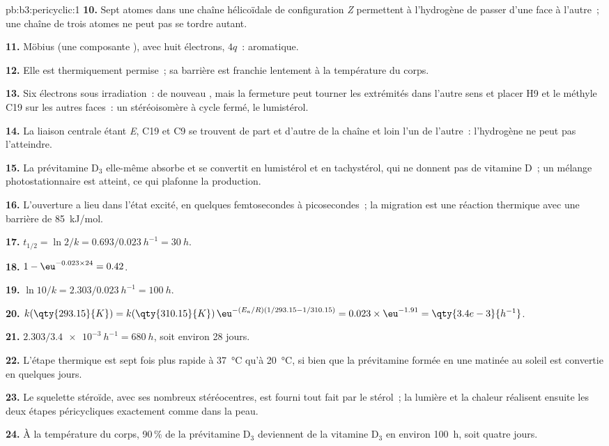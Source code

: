 \begin{solution}{pb:b3:pericyclic:1}
\textbf{10.} Sept atomes dans une chaîne hélicoïdale de configuration \textit{Z} permettent à l'hydrogène de passer d'une face à
l'autre~; une chaîne de trois atomes ne peut pas se tordre autant.

\textbf{11.} Möbius (une composante ), avec huit électrons, $4q$~: aromatique.

\textbf{12.} Elle est thermiquement permise~; sa barrière est franchie lentement à la température du corps.

\textbf{13.} Six électrons sous irradiation~: de nouveau , mais
la fermeture peut tourner les extrémités dans l'autre sens et placer H9 et
le méthyle C19 sur les autres faces~: un stéréoisomère à cycle fermé, le
lumistérol.

\textbf{14.} La liaison centrale étant \textit{E}, C19 et C9 se trouvent de part et d'autre de la chaîne et loin
l'un de l'autre~: l'hydrogène ne peut pas l'atteindre.

\textbf{15.} La prévitamine D$_3$ elle-même absorbe et se convertit en lumistérol et en tachystérol,
qui ne donnent pas de vitamine D~; un mélange photostationnaire est atteint,
ce qui plafonne la production.

\textbf{16.} L'ouverture a lieu dans l'état excité, en quelques
femtosecondes à picosecondes~; la migration est une réaction thermique avec une barrière de \qty{85}{kJ/mol}.

\textbf{17.} $t_{1/2} = \ln 2/k = 0.693/\qty{0.023}{h^{-1}} = \qty{30}{h}$.

\textbf{18.} $1 - \eu^{-0.023 \times 24} = 0.42$.

\textbf{19.} $\ln 10/k = 2.303/\qty{0.023}{h^{-1}} = \qty{100}{h}$.

\textbf{20.} $k(\qty{293.15}{K}) = k(\qty{310.15}{K})\,\eu^{-(E_a/R)(1/293.15 - 1/310.15)} = 0.023 \times \eu^{-1.91} = \qty{3.4e-3}{h^{-1}}$.

\textbf{21.} $2.303/\qty{3.4e-3}{h^{-1}} = \qty{680}{h}$, soit environ 28 jours.

\textbf{22.} L'étape thermique est sept fois plus rapide à \qty{37}{\celsius} qu'à \qty{20}{\celsius}, si bien que la
prévitamine formée en une matinée au soleil est convertie en quelques
jours.

\textbf{23.} Le squelette stéroïde, avec ses nombreux stéréocentres, est
fourni tout fait par le stérol~; la lumière et la chaleur réalisent ensuite
les deux étapes péricycliques exactement comme dans la peau.

\textbf{24.} À la température du corps, 90\,\% de la prévitamine D$_3$ deviennent de la vitamine D$_3$ en environ
\qty{100}{h}, soit quatre jours.
\end{solution}
